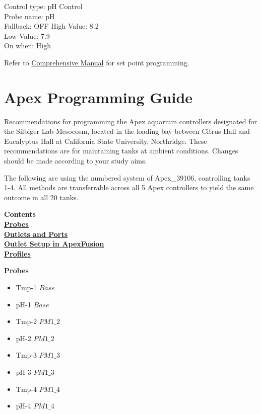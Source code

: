 \documentclass[]{book}
\providecommand{\tightlist}{%
  \setlength{\itemsep}{0pt}\setlength{\parskip}{0pt}}
\begin{document}
Control type: pH Control\\
Probe name: pH\\
Fallback: OFF High Value: 8.2\\
Low Value: 7.9\\
On when: High

Refer to
\href{https://github.com/SilbigerLab/Mesocosm_User_Manual/tree/7503b88686aef920c4a4ed473b1efe37b34dae10/Manuals/Apex_Comprehensive_Reference_Manual.pdf}{Comprehensive
Manual} for set point programming.

\chapter{Apex Programming Guide}\label{apex-programming-guide}

Recommendations for programming the Apex aquarium controllers designated
for the Silbiger Lab Mesocosm, located in the loading bay between Citrus
Hall and Eucalyptus Hall at California State University, Northridge.
These recommendations are for maintaining tanks at ambient conditions.
Changes should be made according to your study aims.

The following are using the numbered system of Apex\_39106, controlling
tanks 1-4. All methods are transferrable across all 5 Apex controllers
to yield the same outcome in all 20 tanks.

\textbf{Contents}\\
\href{08-apex_programming_guide.md\#Probes}{\textbf{Probes}}\\
\href{08-apex_programming_guide.md\#Outlets_and_Ports}{\textbf{Outlets
and Ports}}\\
\href{08-apex_programming_guide.md\#Outlet_Setup}{\textbf{Outlet Setup
in ApexFusion}}\\
\href{08-apex_programming_guide.md\#Profiles}{\textbf{Profiles}}

\textbf{Probes}

\begin{itemize}
\tightlist
\item
  Tmp-1 \(Base\)
\item
  pH-1 \(Base\)
\item
  Tmp-2 \(PM1\_2\)
\item
  pH-2 \(PM1\_2\)
\item
  Tmp-3 \(PM1\_3\)
\item
  pH-3 \(PM1\_3\)
\item
  Tmp-4 \(PM1\_4\)
\item
  pH-4 \(PM1\_4\)
\end{itemize}
\end{document}
